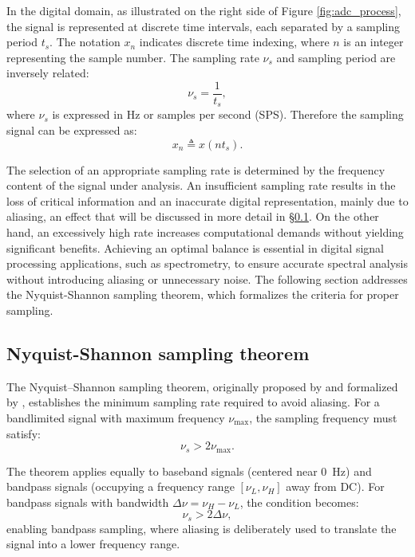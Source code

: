 In the digital domain, as illustrated on the right side of Figure \ref{fig:adc_process}, the signal is represented at discrete time intervals, each separated by a sampling period $t_s$. The notation $x_n$ indicates discrete time indexing, where $n$ is an integer representing the sample number. The sampling rate $\nu_s$ and sampling period are inversely related:
\begin{equation}
	\nu_s = \frac{1}{t_s},
	\label{eq:sampling_frequency}
\end{equation}
where $\nu_s$ is expressed in Hz or samples per second (SPS). Therefore the sampling signal can be expressed as:
\begin{equation}
	x_n \triangleq x(n t_s) .
\end{equation}

The selection of an appropriate sampling rate is determined by the frequency content of the signal under analysis. An insufficient sampling rate results in the loss of critical information and an inaccurate digital representation, mainly due to aliasing, an effect that will be discussed in more detail in \S \ref{sec:nyquist_shannon}. On the other hand, an excessively high rate increases computational demands without yielding significant benefits. Achieving an optimal balance is essential in digital signal processing applications, such as spectrometry, to ensure accurate spectral analysis without introducing aliasing or unnecessary noise. The following section addresses the Nyquist-Shannon sampling theorem, which formalizes the criteria for proper sampling.

\subsection{Nyquist-Shannon sampling theorem}
\label{sec:nyquist_shannon}
The Nyquist–Shannon sampling theorem, originally proposed by \citet{Nyquist1928} and formalized by \citet{Shannon1949}, establishes the minimum sampling rate required to avoid aliasing. For a bandlimited signal with maximum frequency $\nu_{\text{max}}$, the sampling frequency must satisfy:
\begin{equation}
\nu_s > 2\nu_{\text{max}} .
\label{eq:nyquist_condition}
\end{equation}

The theorem applies equally to baseband signals (centered near 0~Hz) and bandpass signals (occupying a frequency range $[\nu_L, \nu_H]$ away from DC). For bandpass signals with bandwidth $\Delta\nu = \nu_H - \nu_L$, the condition becomes:
\begin{equation}
\nu_s > 2\Delta\nu ,
\end{equation}
enabling bandpass sampling, where aliasing is deliberately used to translate the signal into a lower frequency range.

